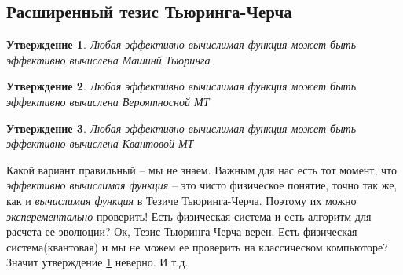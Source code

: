 \documentclass[a0,portrait]{a0poster}
\newtheorem{stat}{Утверждение}[section]
\newcommand{\maps}{\colon}
\newcommand{\tensor}{\otimes}
\begin{document}
\begin{multicols}{2}
\begin{center}
\begin{tabular}{l l l}
\bottomrule
\end{tabular}
\label{analogy_detailed}
\end{center}
% 
% 
% 


\subsection{Расширенный тезис Тьюринга-Черча}
\begin{stat}
\label{ct1}
Любая эффективно вычислимая функция может быть эффективно вычислена Машинй Тьюринга
\end{stat}
 \begin{stat}
 \label{ct2}
Любая эффективно вычислимая функция может быть эффективно вычислена Вероятносной МТ

\end{stat}
\begin{stat}
\label{ct3}
Любая эффективно вычислимая функция может быть эффективно вычислена Квантовой МТ

\end{stat}

Какой вариант правильный -- мы не знаем. Важным для нас есть тот момент, что \textit{эффективно вычислимая функция} -- это чисто физическое понятие, точно так же, как и \textit{вычислимая функция} в Тезиче Тьюринга-Черча. Поэтому их можно \textit{эксперементально} проверить! Есть физическая система и есть алгоритм для расчета ее эволюции? Ок, Тезис Тьюринга-Черча верен. Есть физическая система(квантовая) и мы не можем ее проверить на классическом компьюторе? Значит утверждение \ref{ct1} неверно. И т.д.



\end{multicols}
\end{document}
